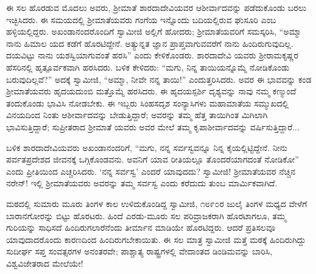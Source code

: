 ಈ ಸಲ ಹೊರಡುವ ಮೊದಲು ಅವರು, ಶ್ರೀಮಾತೆ ಶಾರದಾದೇವಿಯವರ ಆಶೀರ್ವಾದವನ್ನು ಪಡೆದುಕೊಂಡು ಬರಲು ಇಚ್ಛಿಸಿದರು. ಈ ಸಮಯದಲ್ಲಿ ಶ್ರೀಮಾತೆಯವರು ಗಂಗೆಯ ಇನ್ನೊಂದು ಬದಿಯಲ್ಲಿರುವ ಘುಸೂರಿ ಎಂಬ ಹಳ್ಳಿಯಲ್ಲಿದ್ದರು. ಅಖಂಡಾನಂದರೊಂದಿಗೆ ಸ್ವಾಮೀಜಿ ಅಲ್ಲಿಗೆ ಹೋದರು; ಶ್ರೀಮಾತೆಯವರಿಗೆ ಸಮಸ್ಕರಿಸಿ, “ಅಮ್ಮಾ ನಾನು ಹಿಮಾಲ ಯದ ಕಡೆಗೆ ಹೊರಟಿದ್ದೇನೆ. ಅತ್ಯುನ್ನತ ಜ್ಞಾನ ಪ್ರಾಪ್ತವಾಗುವವರೆಗೆ ನಾನು ಹಿಂದಿರುಗುವುದಿಲ್ಲ. ದಯವಿಟ್ಟು ನಾನು ಯಶಸ್ವಿಯಾಗುವಂತೆ ಹರಸಿ” ಎಂದು ಕೇಳಿಕೊಂಡರು. ಶಾರದಾದೇವಿ ಯವರು ಶ್ರೀರಾಮಕೃಷ್ಣರ ಹೆಸರಿನಲ್ಲಿ ಹೃತ್ಪೂರ್ವಕವಾಗಿ ಹರಸಿದರು. ಬಳಿಕ ಕೇಳಿದರು: “ಮಗು, ನಿನ್ನ ತಾಯಿಯನ್ನೊಮ್ಮೆ ನೋಡಿಕೊಂಡು ಬರುವುದಿಲ್ಲವೆ?” ಅದಕ್ಕೆ ಸ್ವಾಮೀಜಿ, “ಅಮ್ಮಾ, ನೀವೇ ನನ್ನ ತಾಯಿ!” ಎಂದುತ್ತರಿಸಿದರು. ಅವರ ಈ ಭಾವವನ್ನು ಕಂಡ ಶ್ರೀಮಾತೆಯವರು ಹೃದಯದುಂಬಿ ಮತ್ತೊಮ್ಮೆ ಹರಸಿದರು. ಈ ಹೃದಯಸ್ಪರ್ಶಿ ದೃಶ್ಯವನ್ನು ನಾವು ನಮ್ಮ ಕಣ್ಮುಂದೆ ತಂದುಕೊಂಡು ಭಾವಿಸಿ ನೋಡಬೇಕು. ಈ ಇಬ್ಬರು ಸಿಂಹಸದೃಶ ಸಂನ್ಯಾಸಿಗಳು ಮಹಾಮಾತೆಯ ಸಮ್ಮುಖದಲ್ಲಿ ವಿನಯದಿಂದ ನಿಂತು ಆಶೀರ್ವಾದವನ್ನು ಬೇಡುತ್ತಿದ್ದಾರೆ; ಅವರನ್ನು ತಮ್ಮ ಹೆತ್ತ ತಾಯಿಗಿಂತ ಮಿಗಿಲಾಗಿ ಭಾವಿಸುತ್ತಿದ್ದಾರೆ; ಸುಪ್ರೀತರಾದ ಶ್ರೀಮಾತೆ ಯವರು ಅವರ ಮೇಲೆ ತಮ್ಮ ಕೃಪಾಶೀರ್ವಾದವನ್ನು ವರ್ಷಿಸುತ್ತಿದ್ದಾರೆ...

ಬಳಿಕ ಶಾರದಾದೇವಿಯವರು ಅಖಂಡಾನಂದರಿಗೆ, “ಮಗು, ನನ್ನ ಸರ್ವಸ್ವವನ್ನೂ ನಿನ್ನ ಕೈಯಲ್ಲಿಟ್ಟಿದ್ದೇನೆ. ನೀನು ಪರ್ವತಪ್ರದೇಶದ ಜೀವನಕ್ಕೆ ಒಗ್ಗಿಕೊಂಡವನು. ಅವನಿಗೆ ಯಾವ ರೀತಿಯಲ್ಲೂ ತೊಂದರೆಯಾಗದಂತೆ ನೋಡಿಕೋ” ಎಂದು ಪ್ರೀತಿಯಿಂದ ಎಚ್ಚರಿಸಿದರು. ‘ನನ್ನ ಸರ್ವಸ್ವ’ ಎಂದರೆ ಯಾವುದದು? ಸ್ವಾಮೀಜಿ! ಶ್ರೀಮಾತೆಯವರ ನೆಚ್ಚಿನ ನರೇನ್! ಇಲ್ಲಿ ಶ್ರೀಮಾತೆಯವರು ಅವರನ್ನು ತಮ್ಮ ಸರ್ವಸ್ವ ಎಂದು ಕರೆದುದು ತುಂಬ ಮಾರ್ಮಿಕವಾಗಿದೆ.

ಮಠದಲ್ಲಿ ಸುಮಾರು ಮೂರು ತಿಂಗಳ ಕಾಲ ಉಳಿದುಕೊಂಡಿದ್ದ ಸ್ವಾಮೀಜಿ, ೧೮೯೦ರ ಜುಲೈ ತಿಂಗಳ ಮಧ್ಯದ ವೇಳೆಗೆ ಬಾರಾನಗೋರನ್ನು ಬಿಟ್ಟು ಹೊರಟರು. ಹಿಂದೆ ಎರಡು-ಮೂರು ಸಲ ಪರಿವ್ರಾಜಕರಾಗಿ ಹೊರಟಾಗಲೂ, ತಮ್ಮ ಗುರಿಯನ್ನು ಸಾಧಿಸದೆ ಹಿಂದಿರುಗಲಾರೆನೆಂದು ತೀರ್ಮಾನ ಮಾಡಿಯೇ ಹೊರಟಿದ್ದರು. ಆದರೆ ಪ್ರತಿಸಲವೂ ಯಾವುದಾದರೊಂದು ಕಾರಣದಿಂದ ಹಿಂದಿರುಗಬೇಕಾಯಿತು. ಈ ಸಲ ಮಾತ್ರ ಸ್ವಾಮೀಜಿ ಮತ್ತೆ ಮಠಕ್ಕೆ ಹಿಂದಿರುಗಿದ್ದು ಸುದೀರ್ಘ ಸಪ್ತ ಸಂವತ್ಸರಗಳ ಅನಂತರವೇ; ಪಾಶ್ಚಾತ್ಯ ರಾಷ್ಟ್ರಗಳಲ್ಲಿ ವೇದಾಂತದ ಡಿಂಡಿಮವನ್ನು ಬಾರಿಸಿ, ವಿಶ್ವವಿಜೇತರಾದ ಮೇಲೆಯೇ!

